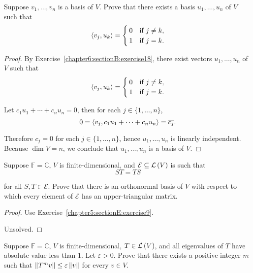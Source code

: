 \begin{exercise}
    Suppose $v_{1}, \ldots, v_{n}$ is a basis of $V$. Prove that there exists a basis $u_{1}, \ldots, u_{n}$ of $V$ such that
    \[
        \left\langle{v_{j}, u_{k}}\right\rangle = \begin{cases}
            0 & \text{if $j\ne k$}, \\
            1 & \text{if $j = k$}.
        \end{cases}
    \]
\end{exercise}

\begin{proof}
    By Exercise~\ref{chapter6:sectionB:exercise18}, there exist vectors $u_{1}, \ldots, u_{n}$ of $V$ such that
    \[
        \left\langle{v_{j}, u_{k}}\right\rangle = \begin{cases}
            0 & \text{if $j\ne k$}, \\
            1 & \text{if $j = k$}.
        \end{cases}
    \]

    Let $c_{1}u_{1} + \cdots + c_{n}u_{n} = 0$, then for each $j\in\{1,\ldots, n\}$,
    \[
        0 = \left\langle{v_{j}, c_{1}u_{1} + \cdots + c_{n}u_{n}}\right\rangle = \overline{c_{j}}.
    \]

    Therefore $c_{j} = 0$ for each $j\in\{1,\ldots, n\}$, hence $u_{1}, \ldots, u_{n}$ is linearly independent. Because $\dim V = n$, we conclude that $u_{1}, \ldots, u_{n}$ is a basis of $V$.
\end{proof}
\newpage

\begin{exercise}
    Suppose $\mathbb{F} = \mathbb{C}$, $V$ is finite-dimensional, and $\mathcal{E} \subseteq \mathcal{L}\left({V}\right)$ is such that
    \[
        ST = TS
    \]

    for all $S, T\in\mathcal{E}$. Prove that there is an orthonormal basis of $V$ with respect to which every element of $\mathcal{E}$ has an upper-triangular matrix.
\end{exercise}

\begin{proof}
    Use Exercise~\ref{chapter5:sectionE:exercise9}.

    Unsolved.
\end{proof}
\newpage

\begin{exercise}
    Suppose $\mathbb{F} = \mathbb{C}$, $V$ is finite-dimensional, $T\in\mathcal{L}\left({V}\right)$, and all eigenvalues of $T$ have absolute value less than $1$. Let $\varepsilon > 0$. Prove that there exists a positive integer $m$ such that $\left\Vert{T^{m}v}\right\Vert\leq \varepsilon \left\Vert{v}\right\Vert$ for every $v\in V$.
\end{exercise}

